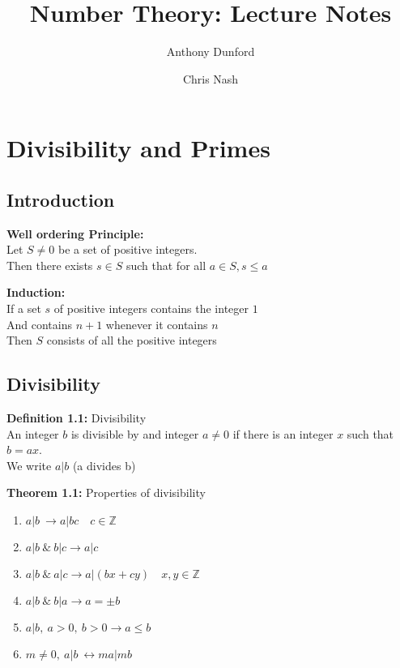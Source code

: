 \documentclass[a4paper]{article}
\title{Number Theory: Lecture Notes}
\author{Anthony Dunford \and Chris Nash}
\begin{document}
\maketitle

\tableofcontents


\section{Divisibility and Primes}

\subsection{Introduction}

\textbf{Well ordering Principle:}\\
Let $S\neq0$ be a set of positive integers.\\
Then there exists $s\in S$ such that for all $a\in S, s\leq a$

\textbf{Induction:}\\
If a set $s$ of positive integers contains the integer $1$\\
And contains $n+1$ whenever it contains $n$\\
Then $S$ consists of all the positive integers

\subsection{Divisibility}

\textbf{Definition 1.1:} Divisibility\\
An integer $b$ is divisible by and integer $a\neq0$ if there is an integer $x$ such that $b=ax$.\\
We write $a|b$ (a divides b)

\textbf{Theorem 1.1:} Properties of divisibility
\begin{enumerate}
    \item $a|b\            \rightarrow a|bc\quad c\in \mathbb{Z}$
    \item $a|b\ \&\ b|c    \rightarrow a|c$
    \item $a|b\ \&\ a|c    \rightarrow a|(bx+cy)\quad x,y\in\mathbb{Z}$
    \item $a|b\ \&\ b|a    \rightarrow a=\pm b$


    \item $a|b,\ a>0,\ b>0 \rightarrow a\leq b$
    \item $m\neq0,\ a|b\   \leftrightarrow ma|mb$
\end{enumerate}
\end{document}
